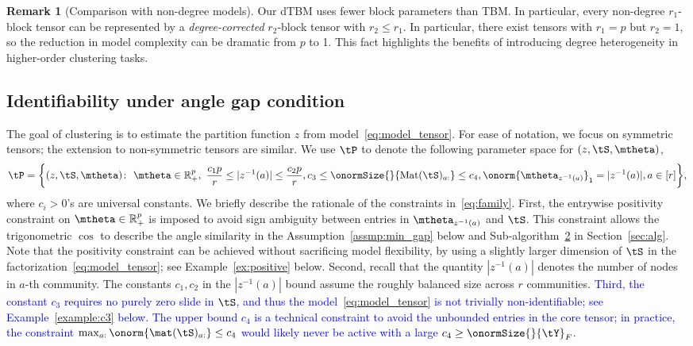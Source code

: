 \documentclass[lettersize,onecolumn,journal]{IEEEtran}
\theoremstyle{definition}
\theoremstyle{definition}
\newtheorem{rmk}{Remark}
\begin{document}
\begin{rmk}[Comparison with non-degree models]
Our dTBM uses fewer block parameters than TBM. In particular, every non-degree $r_1$-block tensor can be represented by a \emph{degree-corrected} $r_2$-block tensor with $r_2\leq r_1$. In particular, there exist tensors with $r_1=p$ but $r_2=1$, so the reduction in model complexity can be dramatic from $p$ to 1. This fact highlights the benefits of introducing degree heterogeneity in higher-order clustering tasks.
\end{rmk}


\subsection{Identifiability under angle gap condition}\label{subsec:identify}
The goal of clustering is to estimate the partition function $z$ from model~\eqref{eq:model_tensor}. For ease of notation, we focus on symmetric tensors; the extension to non-symmetric tensors are similar. We use $\tP$ to denote the following parameter space for $(z,\tS,\mtheta)$,
\begin{align}\label{eq:family}
\tP=\bigg\{(z,\tS,\mtheta)\colon  \ \mtheta\in\mathbb{R}^p_{+},\ 
{c_1p\over r}\leq |z^{-1}(a)|\leq {c_2 p\over r}, c_3\leq \onormSize{}{\text{Mat}(\tS)_{a:}}\leq c_4, \onorm{\mtheta_{z^{-1}(a)}}_1=|z^{-1}(a)|, a\in[r]\bigg\},
\end{align}
\normalsize
where $c_i>0$'s are universal constants. We briefly describe the rationale of the constraints in~\eqref{eq:family}. 
First, the entrywise positivity constraint on  $\mtheta\in\mathbb{R}^p_{+}$ is imposed to avoid sign ambiguity between entries in $\mtheta_{z^{-1}(a)}$ and $\tS$. This constraint allows the trigonometric $\cos$ to describe the angle similarity in the Assumption~\ref{assmp:min_gap} below and Sub-algorithm~\hyperref[alg:main]{2} in Section~\ref{sec:alg}. Note that the positivity constraint can be achieved without sacrificing model flexibility, by using a slightly larger dimension of $\tS$ in the factorization~\eqref{eq:model_tensor}; see Example~\ref{ex:positive} below. Second, recall that the quantity $|z^{-1}(a)|$ denotes the number of nodes in $a$-th community. The constants $c_1, c_2$ in the $|z^{-1}(a)|$ bound assume the roughly balanced size across $r$ communities. \textcolor{blue}{ Third, the constant $c_3$ requires no purely zero slide in $\tS$, and thus the model~\eqref{eq:model_tensor} is not trivially non-identifiable; see Example~\ref{example:c3} below. The upper bound $c_4$ is a technical constraint to avoid the unbounded entries in the core tensor; in practice, the constraint $\max_{a:} \onorm{\mat(\tS)_{a:}} \leq c_4$ would likely never be active with a large $c_4 \geq \onormSize{}{\tY}_F$. }  
\end{document}
